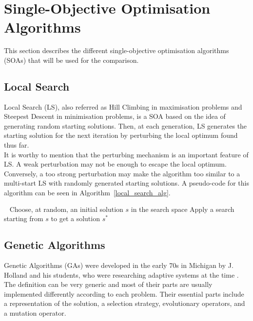 \section{Single-Objective Optimisation Algorithms}

This section describes the different single-objective optimisation algorithms (SOAs) that will be used for the comparison.

\subsection{Local Search}
 
Local Search (LS), also referred as Hill Climbing in maximisation problems and Steepest Descent in minimisation problems, is a SOA based on the idea of generating random starting solutions. Then, at each generation, LS generates the starting solution for the next iteration by perturbing the local optimum found thus far.\\

It is worthy to mention that the perturbing mechanism is an important feature of LS. A weak perturbation may not be enough to escape the local optimum. Conversely, a too strong perturbation may make the algorithm too similar to a multi-start LS with randomly generated starting solutions. A pseudo-code for this algorithm can be seen in Algorithm~\ref{local_search_alg}.\\

\begin{algorithm}[H]
\caption{Local Search Algorithm} 
\label{local_search_alg}
\SetAlgoLined 
 Choose, at random, an initial solution $s$ in the search space\;
 Apply a search starting from $s$ to get a solution $s^*$\;
\end{algorithm}


\subsection{Genetic Algorithms}

Genetic Algorithms (GAs) were developed in the early 70s in Michigan by J. Holland and his students, who were researching adaptive systems at the time \cite{goldberg1988genetic}.
The definition can be very generic and most of their parts are usually implemented differently according to each problem. Their essential parts include a representation of the solution, a selection strategy, evolutionary operators, and a mutation operator.\\

